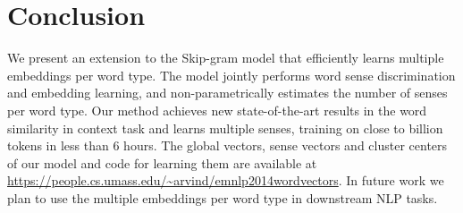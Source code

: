 \documentclass[11pt,a4paper]{article}
\begin{document}








\section{Conclusion} 
We present an extension to the Skip-gram model that efficiently learns multiple embeddings per word type. The model jointly performs word sense discrimination and embedding learning, and  non-parametrically estimates the number of senses per word type. Our method achieves new state-of-the-art results in the word similarity in context task 
and learns multiple senses, training on close to billion tokens in
less than 6 hours. The global vectors, sense vectors and cluster centers of
our model and  code for learning them are available at \url{https://people.cs.umass.edu/~arvind/emnlp2014wordvectors}.
In future work we plan to use the
multiple embeddings per word type in downstream NLP tasks.
\end{document}
